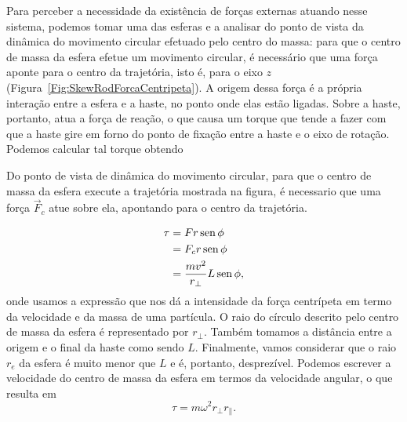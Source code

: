 Para perceber a necessidade da existência de forças externas atuando nesse sistema, podemos tomar uma das esferas e a analisar do ponto de vista da dinâmica do movimento circular efetuado pelo centro do massa: para que o centro de massa da esfera efetue um movimento circular, é necessário que uma força aponte para o centro da trajetória, isto é, para o eixo $z$ (Figura~\ref{Fig:SkewRodForcaCentripeta}). A origem dessa força é a própria interação entre a esfera e a haste, no ponto onde elas estão ligadas. Sobre a haste, portanto, atua a força de reação, o que causa um torque  que tende a fazer com que a haste gire em forno do ponto de fixação entre a haste e o eixo de rotação. Podemos calcular tal torque obtendo

\begin{marginfigure}
\centering
{}
\caption{Do ponto de vista de dinâmica do movimento circular, para que o centro de massa da esfera execute a trajetória mostrada na figura, é necessario que uma força $\vec{F}_c$ atue sobre ela, apontando para o centro da trajetória. \label{Fig:SkewRodForcaCentripeta}}
\end{marginfigure}

\begin{align}
    \tau &= F r \operatorname{sen}\phi \\
    &= F_c r \operatorname{sen} \phi \\
    &= \frac{mv^2}{r_\perp} L \operatorname{sen}\phi,
\end{align}
%
\noindent{}onde usamos a expressão que nos dá a intensidade da força centrípeta em termo da velocidade e da massa de uma partícula. O raio do círculo descrito pelo centro de massa da esfera é representado por $r_\perp$. Também tomamos a distância entre a origem e o final da haste como sendo $L$. Finalmente, vamos considerar que o raio $r_e$ da esfera é muito menor que $L$ e é, portanto, desprezível. Podemos escrever a velocidade do centro de massa da esfera em termos da velocidade angular, o que resulta em
\begin{equation}
    \tau = m\omega^2 r_\perp r_\parallel.
\end{equation}

